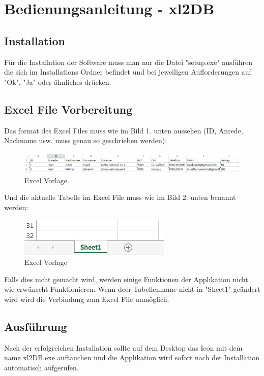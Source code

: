 \documentclass{article}
\begin{document}
\section*{\centering Bedienungsanleitung  - xl2DB}
\subsection*{Installation}
Für die Installation der Software muss man nur die Datei "setup.exe" ausführen die sich im Installations Ordner befindet und bei jeweiligen Aufforderungen auf "Ok", "Ja" oder ähnliches drücken.

\subsection*{Excel File Vorbereitung}
Das format des Excel Files muss wie im Bild 1. unten aussehen (ID, Anrede, Nachname usw. muss genau so geschrieben werden): 
\begin{figure}[h]
	\begin{center}
		\centering
		\includegraphics[width=0.8\paperwidth]{vorlageExcel}
		\caption{Excel Vorlage}
	\end{center}
\end{figure}

Und die aktuelle Tabelle im Excel File muss wie im Bild 2. unten benannt werden: 
\begin{figure}[h]
	\begin{center}
		\centering
		\includegraphics[width=0.3\paperwidth]{vorlageExcelSheet1}
		\caption{Excel Vorlage}
	\end{center}
\end{figure}

Falls dies nicht gemacht wird, werden einige Funktionen der Applikation nicht wie erwünscht Funktionieren. Wenn deer Tabellenname nicht in "Sheet1" geändert wird wird die Verbindung zum Excel File unmöglich.

\subsection*{Ausführung}
Nach der erfolgreichen Installation sollte auf dem Desktop das Icon mit dem name xl2DB.exe auftauchen und die Applikation wird sofort nach der Installation automatisch aufgerufen.
\end{document}
